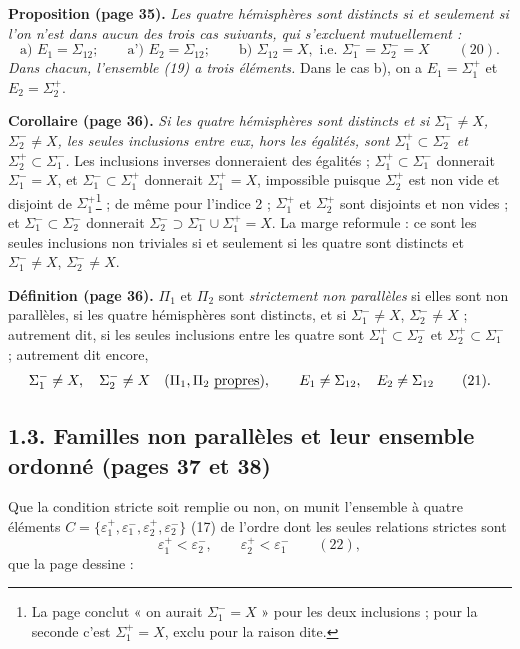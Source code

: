 \documentclass[11pt,a4paper]{article}
\begin{document}
\textbf{Proposition (page 35).} \emph{Les quatre hémisphères sont distincts
si et seulement si l'on n'est dans aucun des trois cas suivants, qui
s'excluent mutuellement :}
\[
\text{a) } E_1 = \Sigma_{12}; \qquad \text{a') } E_2 = \Sigma_{12}; \qquad
\text{b) } \Sigma_{12} = X, \text{ i.e. } \Sigma_1^{-} = \Sigma_2^{-} = X
\qquad (20).
\]
\emph{Dans chacun, l'ensemble (19) a trois éléments.} Dans le cas b), on a
$E_1 = \Sigma_1^{+}$ et $E_2 = \Sigma_2^{+}$.

\textbf{Corollaire (page 36).} \emph{Si les quatre hémisphères sont
distincts et si $\Sigma_1^{-} \neq X$, $\Sigma_2^{-} \neq X$, les seules
inclusions entre eux, hors les égalités, sont $\Sigma_1^{+} \subset
\Sigma_2^{-}$ et $\Sigma_2^{+} \subset \Sigma_1^{-}$.} Les inclusions
inverses donneraient des égalités ; $\Sigma_1^{+} \subset \Sigma_1^{-}$
donnerait $\Sigma_1^{-} = X$, et $\Sigma_1^{-} \subset \Sigma_1^{+}$
donnerait $\Sigma_1^{+} = X$, impossible puisque $\Sigma_2^{+}$ est non vide
et disjoint de $\Sigma_1^{+}$\footnote{La page conclut « on aurait
$\Sigma_1^{-} = X$ » pour les deux inclusions ; pour la seconde c'est
$\Sigma_1^{+} = X$, exclu pour la raison dite.} ; de même pour l'indice 2 ;
$\Sigma_1^{+}$ et $\Sigma_2^{+}$ sont disjoints et non vides ; et
$\Sigma_1^{-} \subset \Sigma_2^{-}$ donnerait $\Sigma_2^{-} \supset
\Sigma_1^{-} \cup \Sigma_1^{+} = X$. La marge reformule : ce sont les
seules inclusions non triviales si et seulement si les quatre sont distincts
et $\Sigma_1^{-} \neq X$, $\Sigma_2^{-} \neq X$.

\textbf{Définition (page 36).} $\Pi_1$ et $\Pi_2$ sont \emph{strictement non
parallèles} si elles sont non parallèles, si les quatre hémisphères sont
distincts, et si $\Sigma_1^{-} \neq X$, $\Sigma_2^{-} \neq X$ ; autrement
dit, si les seules inclusions entre les quatre sont $\Sigma_1^{+} \subset
\Sigma_2^{-}$ et $\Sigma_2^{+} \subset \Sigma_1^{-}$ ; autrement dit encore,
\[
\Sigma_1^{-} \neq X, \quad \Sigma_2^{-} \neq X \quad (\Pi_1, \Pi_2
\text{ \emph{propres}}), \qquad E_1 \neq \Sigma_{12}, \quad E_2 \neq
\Sigma_{12} \qquad (21).
\]

\subsection*{1.3. Familles non parallèles et leur ensemble ordonné (pages 37 et 38)}

Que la condition stricte soit remplie ou non, on munit l'ensemble à quatre
éléments $C = \{\varepsilon_1^{+}, \varepsilon_1^{-}, \varepsilon_2^{+},
\varepsilon_2^{-}\}$ (17) de l'ordre dont les seules relations strictes sont
\[
\varepsilon_1^{+} < \varepsilon_2^{-}, \qquad \varepsilon_2^{+} <
\varepsilon_1^{-} \qquad (22),
\]
que la page dessine :
\end{document}
